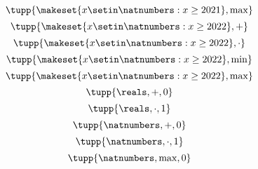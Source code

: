 {\begin{forslides}
\begin{equation}
            \tupp{ \makeset{x\setin\natnumbers: x \geq 2021 }, \max}
        \end{equation}
        \begin{equation}
            \label{eq:example-nats22-plus}
            \tupp{ \makeset{x\setin\natnumbers: x \geq 2022 }, +}
        \end{equation}
        \begin{equation}
            \label{eq:example-nats22-mult}
            \tupp{ \makeset{x\setin\natnumbers: x \geq 2022 }, \cdot}
        \end{equation}
        \begin{equation}
            \label{eq:example-nats22-min}
            \tupp{ \makeset{x\setin\natnumbers: x \geq 2022 }, \min}
        \end{equation}
        \begin{equation}
            \label{eq:example-nats22-max}
            \tupp{ \makeset{x\setin\natnumbers: x \geq 2022 }, \max}
        \end{equation}
        \begin{equation}
            \label{eq:example-monoid-reals-plus-zero}
            \tupp{\reals, +, 0}
        \end{equation}
        \begin{equation}
            \label{eq:example-monoid-reals-mult-one}
            \tupp{\reals, \cdot, 1}
        \end{equation}
        \begin{equation}
            \label{eq:example-monoid-nats-plus-zero}
            \tupp{\natnumbers, +, 0}
        \end{equation}
        \begin{equation}
            \label{eq:example-monoid-nats-mult-one}
            \tupp{\natnumbers, \cdot, 1}
        \end{equation}
        \begin{equation}
            \label{eq:example-monoid-nats-max-zero}
            \tupp{\natnumbers, \max, 0}
        \end{equation}
    \end{forslides}
}
